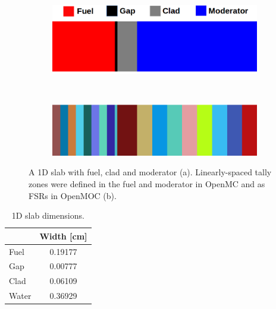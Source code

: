 \begin{figure}[h!]
\begin{subfigure}{\textwidth}
  \centering
  \includegraphics[width=0.7\linewidth]{figures/biases/slab/slab-simple-labels}
  \caption{}
  \label{fig:chap5-slab-a}
\end{subfigure} \\
\begin{subfigure}{\textwidth}
  \centering
  \includegraphics[width=0.7\linewidth]{figures/biases/slab/slab-8x}
  \caption{}
  \label{fig:chap5-slab-b}
\end{subfigure}
\caption[1D slab materials and geometry]{A 1D slab with fuel, clad and moderator (a). Linearly-spaced tally zones were defined in the fuel and moderator in OpenMC and as \ac{FSR}s in OpenMOC (b).}
\label{fig:chap5-slab}
\end{figure}

\begin{table}[h!]
  \centering
  \caption[1D slab dimensions]{1D slab dimensions.}
  \small
  \label{table:chap5-slab-widths} 
  \vspace{6pt}
  \begin{tabular}{b c}
  \toprule
  \rowcolor{lightgray}
  \multicolumn{1}{c}{\bf Material} &
  \multicolumn{1}{c}{\bf Width [cm]} \\
  \midrule
  Fuel &  0.19177 \\
  Gap &   0.00777 \\
  Clad &  0.06109 \\
  Water & 0.36929 \\
  \bottomrule
\end{tabular}
\end{table}

